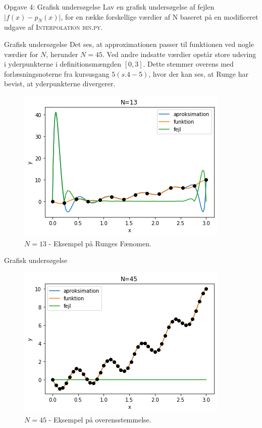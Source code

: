 \begin{frame}{Opgave 4: Grafisk undersøgelse}
    Lav en grafisk undersøgelse af fejlen $\lvert f(x)-p_N(x) \rvert$, for en række forskellige værdier af N baseret på en modificeret udgave af \textsc{Interpolation bin.py.}
\end{frame}

\begin{frame}{Grafisk undersøgelse}
    Det ses, at approximationen passer til funktionen ved nogle værdier for $N$, herunder $N = 45$. 
    Ved andre indsatte værdier opstår store udsving i yderpunkterne i definitionsmængden $[0,3]$.
    Dette stemmer overens med forlæsningsnoterne fra kursusgang $5(s.4-5)$, hvor der kan ses, at Runge har bevist, at yderpunkterne divergerer.
    \begin{figure}[h!]
    \begin{center}
    \includegraphics[scale=0.5]{images/N=13.png}
    \end{center}
    \caption{$N = 13$ - Eksempel på Runges Fænomen.}
    \end{figure} 
\end{frame}

\begin{frame}{Grafisk undersøgelse}
    \begin{figure}[h!]
    \begin{center}
    \includegraphics[scale=0.5]{images/N=45.png}
    \end{center}
    \caption{$N = 45$ - Eksempel på overensstemmelse.}
    \end{figure}
\end{frame}


